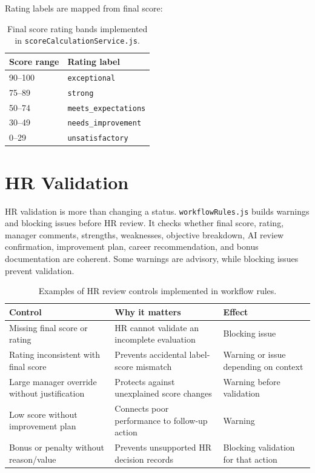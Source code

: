 Rating labels are mapped from final score:
\begin{table}[H]\centering
\caption{Final score rating bands implemented in \texttt{scoreCalculationService.js}.}
\label{tab:rating-bands}
\begin{tabular}{ll}
\toprule
Score range & Rating label\\
\midrule
90--100 & \texttt{exceptional}\\
75--89 & \texttt{strong}\\
50--74 & \texttt{meets\_expectations}\\
30--49 & \texttt{needs\_improvement}\\
0--29 & \texttt{unsatisfactory}\\
\bottomrule
\end{tabular}
\end{table}

\section{HR Validation}
HR validation is more than changing a status. \texttt{workflowRules.js} builds warnings and blocking issues before HR review. It checks whether final score, rating, manager comments, strengths, weaknesses, objective breakdown, AI review confirmation, improvement plan, career recommendation, and bonus documentation are coherent. Some warnings are advisory, while blocking issues prevent validation.



\begin{table}[H]\centering\small
\caption{Examples of HR review controls implemented in workflow rules.}
\label{tab:hr-blocking-rules}
\begin{tabularx}{\textwidth}{p{}p{}Y}
\toprule
Control & Why it matters & Effect\\
\midrule
Missing final score or rating & HR cannot validate an incomplete evaluation & Blocking issue\\
Rating inconsistent with final score & Prevents accidental label-score mismatch & Warning or issue depending on context\\
Large manager override without justification & Protects against unexplained score changes & Warning before validation\\
Low score without improvement plan & Connects poor performance to follow-up action & Warning\\
Bonus or penalty without reason/value & Prevents unsupported HR decision records & Blocking validation for that action\\
\bottomrule
\end{tabularx}
\end{table}

